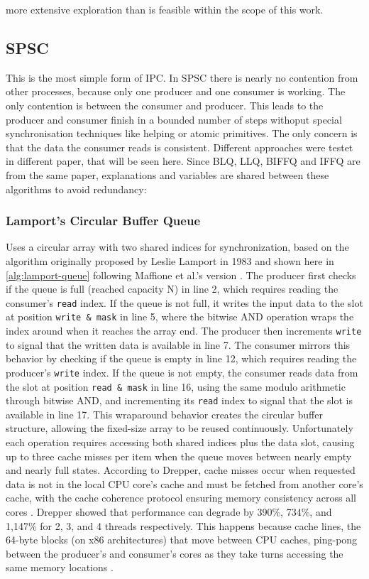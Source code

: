 more extensive exploration than is feasible within the scope of this work.

\subsection{\acf{SPSC}}\label{subsec:single-producer-and-single-consumer}
This is the most simple form of \ac{IPC}. In \ac{SPSC} there is nearly no contention from other processes, because only one producer and one consumer is working. The only contention is between the consumer and producer. This leads to the producer and consumer finish in a bounded number of steps withoput special synchronisation techniques like helping or atomic primitives. The only concern is that the data the consumer reads is consistent. Different approaches were testet in different paper, that will be seen here. Since \ac{BLQ}, \ac{LLQ}, \ac{BIFFQ} and \ac{IFFQ} are from the same paper, explanations and variables are shared between these algorithms to avoid redundancy:

\subsubsection{Lamport's Circular Buffer Queue}
Uses a circular array with two shared indices for synchronization, based on the algorithm originally proposed by Leslie Lamport in 1983 \cite{Lamport1983SPSCCircularBuffer} and shown here in \cref{alg:lamport-queue} following Maffione et al.'s version \cite{MaffioneCacheAware}. The producer first checks if the queue is full (reached capacity N) in line 2, which requires reading the consumer's \texttt{read} index. If the queue is not full, it writes the input data to the slot at position \texttt{write \& mask} in line 5, where the bitwise AND operation wraps the index around when it reaches the array end. The producer then increments \texttt{write} to signal that the written data is available in line 7. The consumer mirrors this behavior by checking if the queue is empty in line 12, which requires reading the producer's \texttt{write} index. If the queue is not empty, the consumer reads data from the slot at position \texttt{read \& mask} in line 16, using the same modulo arithmetic through bitwise AND, and incrementing its \texttt{read} index to signal that the slot is available in line 17. This wraparound behavior creates the circular buffer structure, allowing the fixed-size array to be reused continuously. Unfortunately each operation requires accessing both shared indices plus the data slot, causing up to three cache misses per item when the queue moves between nearly empty and nearly full states. According to Drepper, cache misses occur when requested data is not in the local CPU core's cache and must be fetched from another core's cache, with the cache coherence protocol ensuring memory consistency across all cores \cite{drepper2007every}. Drepper showed that performance can degrade by 390\%, 734\%, and 1,147\% for 2, 3, and 4 threads respectively. This happens because cache lines, the 64-byte blocks (on x86 architectures) that move between CPU caches, ping-pong between the producer's and consumer's cores as they take turns accessing the same memory locations \cite{drepper2007every}.

